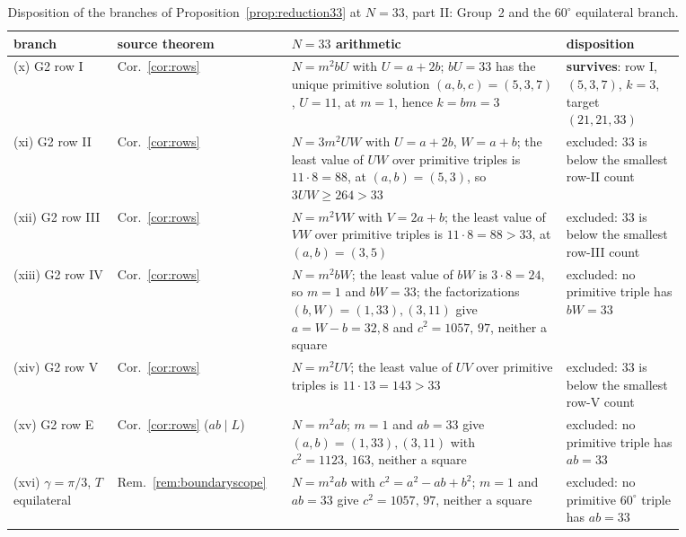 \documentclass[11pt]{amsart}
\theoremstyle{definition}
\theoremstyle{remark}
\begin{document}
\begin{table}[ht]
\centering
\small
\renewcommand{\arraystretch}{1.15}
\begin{tabular}{@{}>{\raggedright\arraybackslash}p{0.145\linewidth}
>{\raggedright\arraybackslash}p{0.185\linewidth}
>{\raggedright\arraybackslash}p{0.375\linewidth}
>{\raggedright\arraybackslash}p{0.165\linewidth}@{}}
\toprule
branch & source theorem & $N=33$ arithmetic & disposition \\
\midrule
(x) G2 row I
 & Cor.~\ref{cor:rows}
 & $N=m^2bU$ with $U=a+2b$; $bU=33$ has the unique primitive solution
   $(a,b,c)=(5,3,7)$, $U=11$, at $m=1$, hence $k=bm=3$
 & \textbf{survives}: row I, $(5,3,7)$, $k=3$, target $(21,21,33)$ \\
(xi) G2 row II
 & Cor.~\ref{cor:rows}
 & $N=3m^2UW$ with $U=a+2b$, $W=a+b$; the least value of $UW$ over
   primitive triples is $11\cdot8=88$, at $(a,b)=(5,3)$, so
   $3UW\ge264>33$
 & excluded: $33$ is below the smallest row-II count \\
(xii) G2 row III
 & Cor.~\ref{cor:rows}
 & $N=m^2VW$ with $V=2a+b$; the least value of $VW$ over primitive triples
   is $11\cdot8=88>33$, at $(a,b)=(3,5)$
 & excluded: $33$ is below the smallest row-III count \\
(xiii) G2 row IV
 & Cor.~\ref{cor:rows}
 & $N=m^2bW$; the least value of $bW$ is $3\cdot8=24$, so $m=1$ and
   $bW=33$; the factorizations $(b,W)=(1,33),(3,11)$ give $a=W-b=32,8$ and
   $c^2=1057,\,97$, neither a square
 & excluded: no primitive triple has $bW=33$ \\
(xiv) G2 row V
 & Cor.~\ref{cor:rows}
 & $N=m^2UV$; the least value of $UV$ over primitive triples is
   $11\cdot13=143>33$
 & excluded: $33$ is below the smallest row-V count \\
(xv) G2 row E
 & Cor.~\ref{cor:rows} ($ab\mid L$)
 & $N=m^2ab$; $m=1$ and $ab=33$ give $(a,b)=(1,33),(3,11)$ with
   $c^2=1123,\,163$, neither a square
 & excluded: no primitive triple has $ab=33$ \\
(xvi) $\gamma=\pi/3$, $T$ equilateral
 & Rem.~\ref{rem:boundaryscope}
 & $N=m^2ab$ with $c^2=a^2-ab+b^2$; $m=1$ and $ab=33$ give
   $c^2=1057,\,97$, neither a square
 & excluded: no primitive $60^\circ$ triple has $ab=33$ \\
\bottomrule
\end{tabular}
\caption{Disposition of the branches of Proposition~\ref{prop:reduction33}
at $N=33$, part II: Group~2 and the $60^\circ$ equilateral branch.}
\label{tab:disposition33b}
\end{table}
\end{document}
